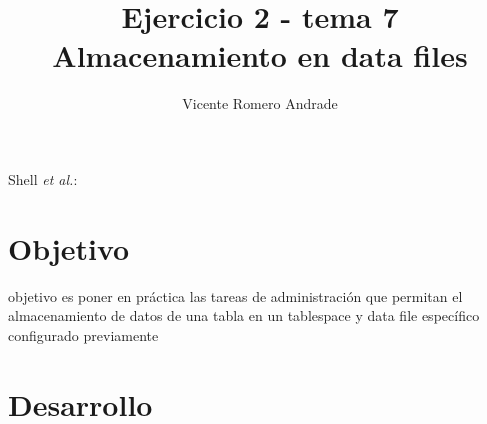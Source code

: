 \documentclass[journal]{IEEEtran}
\begin{document}
\title{Ejercicio 2 - tema 7 \\ Almacenamiento en data files}
%
\author{Vicente Romero Andrade}

%
{Shell \MakeLowercase{\textit{et al.}}: }

\maketitle


\IEEEpeerreviewmaketitle

\section{Objetivo}

 objetivo es poner en práctica las tareas de administración 
que permitan el almacenamiento de datos de una tabla en un tablespace y data file 
específico configurado previamente

\section{Desarrollo}
\end{document}
